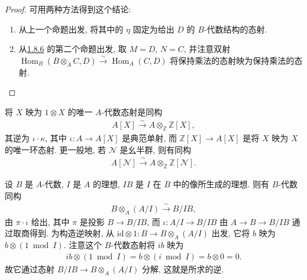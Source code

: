\begin{proof}
可用两种方法得到这个结论:
\begin{enumerate}
\item 从上一个命题出发, 将其中的 $\eta$ 固定为给出 $D$ 的 $B$-代数结构的态射.
\item 从\hyperref[sec:galois-1-8-6]{1.8.6} 的第二个命题出发, 取 $M=D$, $N=C$, 并注意双射 $\operatorname{Hom}_B(B\otimes_A C,D)\xrightarrow{\sim}\operatorname{Hom}_A(C,D)$ 将保持乘法的态射映为保持乘法的态射.
\end{enumerate}
\end{proof}
\begin{example*}
将 $X$ 映为 $1\otimes X$ 的唯一 $A$-代数态射是同构
\begin{align*}
A[X]\xrightarrow{\sim}A\otimes_{\mathbb Z}\mathbb Z[X],
\end{align*}
其逆为 $\iota\cdot\kappa$, 其中 $\iota:A\longrightarrow A[X]$ 是典范单射, 而 $\mathbb Z[X]\longrightarrow A[X]$ 是将 $X$ 映为 $X$ 的唯一环态射. 更一般地, 若 $\mathcal N$ 是幺半群, 则有同构
\begin{align*}
A[\mathcal N]\xrightarrow{\sim}A\otimes_{\mathbb Z}\mathbb Z[\mathcal N].
\end{align*}
\end{example*}
\begin{example*}
设 $B$ 是 $A$-代数, $I$ 是 $A$ 的理想, $IB$ 是 $I$ 在 $B$ 中的像所生成的理想. 则有 $B$-代数同构
\begin{align*}
B\otimes_A(A/I)\xrightarrow{\sim}B/IB,
\end{align*}
由 $\pi\cdot\iota$ 给出, 其中 $\pi$ 是投影 $B\longrightarrow B/IB$, 而 $\iota:A/I\longrightarrow B/IB$ 由 $A\longrightarrow B\longrightarrow B/IB$ 通过取商得到. 为构造逆映射, 从 $\mathrm{id}\otimes1:B\longrightarrow B\otimes_A(A/I)$ 出发, 它将 $b$ 映为 $b\otimes(1\bmod I)$. 注意这个 $B$-代数态射将 $ib$ 映为
\begin{align*}
ib\otimes(1\bmod I)=b\otimes(i\bmod I)=b\otimes0=0.
\end{align*}
故它通过态射 $B/IB\longrightarrow B\otimes_A(A/I)$ 分解, 这就是所求的逆.
\end{example*}

